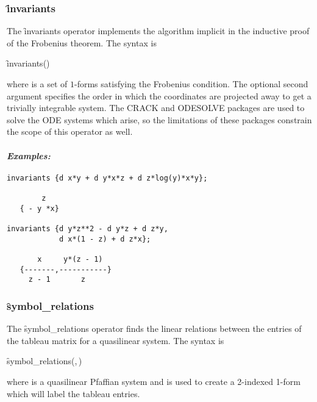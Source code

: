 \subsubsection{\f{invariants}}
\label{invariants}

\hypertarget{operator:INVARIANTS}{}
The \f{invariants} operator implements the algorithm implicit in the
inductive proof of the Frobenius theorem. The syntax is
\begin{syntax}
	\f{invariants}()
\end{syntax}
where  is a set of $1$-forms satisfying the Frobenius condition.
The optional second argument specifies the order in which the coordinates
are projected away to get a trivially integrable system.  The CRACK and
ODESOLVE packages are used to solve the ODE systems which arise, so the
limitations of these packages constrain the scope of this operator as well.

\paragraph{\textit{Examples:}}
\begin{verbatim}
invariants {d x*y + d y*x*z + d z*log(y)*x*y};

        z
   { - y *x}

invariants {d y*z**2 - d y*z + d z*y,
            d x*(1 - z) + d z*x};

       x     y*(z - 1)
   {-------,-----------}
     z - 1       z
\end{verbatim}


\subsubsection{\f{symbol\_relations}}
\label{symbol_relations}

\hypertarget{operator:SYMBOL_RELATIONS}{}
The \f{symbol\_relations} operator finds the linear relations between the
entries of the tableau matrix for a quasilinear system. The syntax is
\begin{syntax}
  \f{symbol\_relations}(,\,)
\end{syntax}
where  is a quasilinear Pfaffian system and  is
used to create a 2-indexed 1-form which will label the tableau entries.

